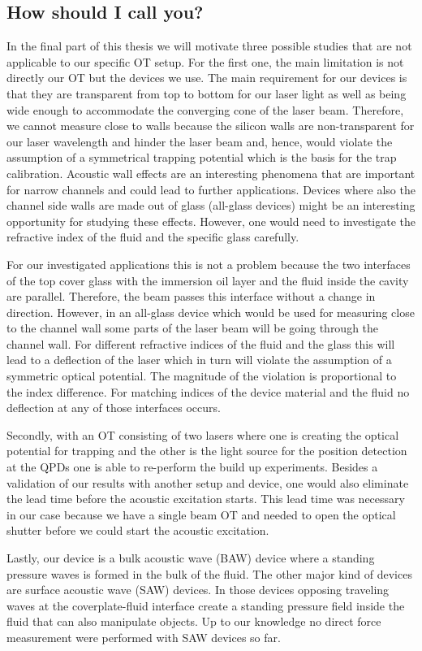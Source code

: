 \subsection{How should I call you?}

In the final part of this thesis we will motivate three possible studies that 
are not applicable to our specific OT setup. For the first one, the main 
limitation is not directly our OT but the devices we use. The main requirement 
for our devices is that they are transparent from top to bottom for our laser 
light as well as being wide enough to accommodate the converging cone of the 
laser beam. Therefore, we cannot measure close to walls because the silicon 
walls are non-transparent for our laser wavelength and hinder the laser beam 
and, hence, would violate the assumption of a symmetrical trapping potential 
which is the basis for the trap calibration. Acoustic wall effects are an 
interesting phenomena that are important for narrow channels and could lead to 
further applications. Devices where also the channel side walls are made out of 
glass (all-glass devices) might be an interesting opportunity for studying 
these effects. However, one would need to investigate the refractive index of 
the fluid and the specific glass carefully.

For our investigated applications this is not a problem because the two 
interfaces of the top cover glass with the immersion oil layer and the fluid 
inside the cavity are parallel. Therefore, the beam passes this interface 
without a change in direction. However, in an all-glass device which would be 
used for measuring close to the channel wall some parts of the laser beam will 
be going through the channel wall. For different refractive indices of the 
fluid and the glass this will lead to a deflection of the laser which in turn 
will violate the assumption of a symmetric optical potential. The magnitude of 
the violation is proportional to the index difference. For matching indices of 
the device material and the fluid no deflection at any of those interfaces 
occurs.

Secondly, with an OT consisting of two lasers where one is creating the optical 
potential for trapping and the other is the light source for the position 
detection at the QPDs one is able to re-perform the build up experiments. 
Besides a validation of our results with another setup and device, one would 
also eliminate the lead time before the acoustic excitation starts. This lead 
time was necessary in our case because we have a single beam OT and needed to 
open the optical shutter before we could start the acoustic excitation.

Lastly, our device is a bulk acoustic wave (BAW) device where a standing 
pressure waves is formed in the bulk of the fluid. The other major kind of 
devices are surface acoustic wave (SAW) devices. In those devices opposing 
traveling waves at the coverplate-fluid interface create a standing pressure 
field inside the fluid that can also manipulate objects. Up to our knowledge no 
direct force measurement were performed with SAW devices so far.
